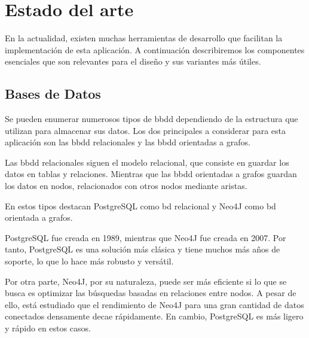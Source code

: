   
\chapter{Estado del arte\label{CAP:ESTADOARTE}}
  En la actualidad, existen muchas herramientas de desarrollo que facilitan la implementación de esta aplicación. A continuación describiremos los componentes esenciales que son relevantes para el diseño y sus variantes más útiles.
  
  \section{Bases de Datos}
    Se pueden enumerar numerosos tipos de \ac{bbdd} dependiendo de la estructura que utilizan para almacenar sus datos. Los dos principales a considerar para esta aplicación son las \ac{bbdd} relacionales y las \ac{bbdd} orientadas a grafos.
    
    Las \ac{bbdd} relacionales siguen el modelo relacional, que consiste en guardar los datos en tablas y relaciones. Mientras que las \ac{bbdd} orientadas a grafos guardan los datos en nodos, relacionados con otros nodos mediante aristas.
    
    En estos tipos destacan PostgreSQL\cite{postgres} como \ac{bd} relacional y Neo4J\cite{neo4j} como \ac{bd} orientada a grafos.
    
    PostgreSQL fue creada en 1989, mientras que Neo4J fue creada en 2007. Por tanto, PostgreSQL es una solución más clásica y tiene muchos más años de soporte, lo que lo hace más robusto y versátil.
  
    Por otra parte, Neo4J, por su naturaleza, puede ser más eficiente si lo que se busca es optimizar las búsquedas basadas en relaciones entre nodos. A pesar de ello, está estudiado que el rendimiento de Neo4J para una gran cantidad de datos conectados densamente decae rápidamente. En cambio, PostgreSQL es más ligero y rápido en estos casos.
    
